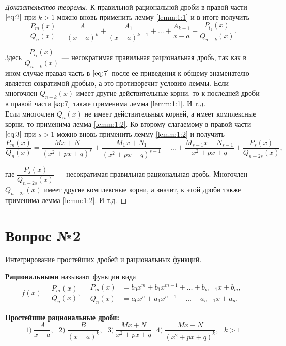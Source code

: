\documentclass[12pt]{report}
\numberwithin{equation}{section}
\begin{document}
\begin{proof}[Доказательство теоремы]
К правильной рациональной дроби в правой части $\eqref{eq:2}$ при $k > 1$ можно вновь применить лемму \ref{lemm:1:1} и в итоге получить
\begin{equation}\label{eq:7}
\frac{P_m(x)}{Q_n(x)} = \frac{A}{(x-a)^k} + \frac{A_1}{(x-a)^{k-1}} + \ldots + \frac{A_{k-1}}{x-a} + \frac{P_{l_1}(x)}{Q_{n-k}(x)}.
\end{equation}

Здесь $\dfrac{P_{l_1}(x)}{Q_{n-k}(x)}$ --- несократимая правильная рациональная дробь, так как в ином случае правая часть в $\eqref{eq:7}$ после ее приведения к общему знаменателю является сократимой дробью, а это противоречит условию леммы. Если многочлен $Q_{n-k}(x)$ имеет другие действительные корни, то к последней дроби в правой части $\eqref{eq:7}$ также применима лемма \ref{lemm:1:1}. И т.д.\\

Если многочлен $Q_n(x)$  не имеет действительных корней, а имеет комплексные корни, то применима лемма \ref{lemm:1:2}. Ко второму слагаемому в правой части $\eqref{eq:3}$ при $s > 1$ можно вновь применить лемму \ref{lemm:1:2} и получить
\[ \frac{P_m(x)}{Q_n(x)} = \frac{Mx + N}{(x^2 + px + q)^s} + \frac{M_1x + N_1}{(x^2 + px + q)^{s-1}} + \ldots + \frac{M_{s-1}x + N_{s-1}}{x^2 + px + q} + \frac{P_s(x)}{Q_{n-2s}(x)},\]

где $\dfrac{P_s(x)}{Q_{n-2s} (x)}$ ---  несократимая правильная рациональная дробь. Многочлен $Q_{n-2s}(x)$ имеет другие комплексные корни, а значит, к этой дроби также применима лемма \ref{lemm:1:2}. И т.д.
\end{proof}

\newpage \section{Вопрос №2} %
\begin{framed}Интегрирование простейших дробей и рациональных функций.
\end{framed}
\textbf{Рациональными} называют функции вида
\[f(x) = \frac{P_m(x)}{Q_n(x)},~~~~
\begin{aligned}
P_m(x) &= b_0x^m + b_1 x^{m-1} + \ldots + b_{m-1}x +b_m,\\
Q_n(x) &= a_0 x^n + a_1 x^{n-1} + \ldots + a_{n-1}x + a_n.
 \end{aligned}\]

\textbf{Простейшие рациональные дроби:}
\[ 1)~\frac{A}{x-a},~~~2)~\frac{B}{(x-a)^k},~~~3)~\frac{Mx + N}{x^2 + px + q}~~~4)~\frac{Mx+N}{(x^2 + px + q)^k},~~~k>1\]
\end{document}
